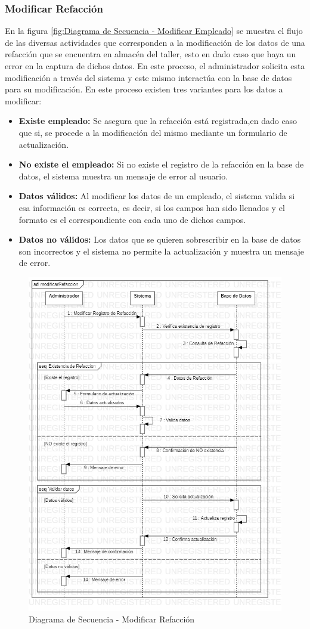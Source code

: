 \subsubsection{Modificar Refacción}
En la figura \ref{fig:Diagrama de Secuencia - Modificar Empleado} se muestra el flujo de las diversas actividades que corresponden a la modificación de los datos de una refacción que se encuentra en almacén del taller, esto en dado caso que haya un error en la captura de dichos datos. En este proceso, el administrador solicita esta modificación a través del sistema y este mismo interactúa con la base de datos para su modificación. En este proceso existen tres variantes para los datos a modificar:
\begin{itemize}
	\item \textbf{Existe empleado:} Se asegura que la refacción está registrada,en dado caso que si, se procede a la modificación del mismo mediante un formulario de actualización.
	\item \textbf{No existe el empleado:} Si no existe el registro de la refacción en la base de datos, el sistema muestra un mensaje de error al usuario.
	\item \textbf{Datos válidos:} Al modificar los datos de un empleado, el sistema valida si esa información es correcta, es decir, si los campos han sido llenados y el formato es el correspondiente con cada uno de dichos campos.
	\item \textbf{Datos no válidos:} Los datos que se quieren sobrescribir en la base de datos son incorrectos y el sistema no permite la actualización y muestra un mensaje de error.
\end{itemize}
\begin{figure}[!h]
	\centering
	\includegraphics[width=1\textwidth]{./diseno/vprocesos/imagenes/modificarRefaccion}
	\caption{Diagrama de Secuencia - Modificar Refacción}
	\label{fig:Diagrama de Secuencia - Modificar Refaccion}
\end{figure}
\clearpage